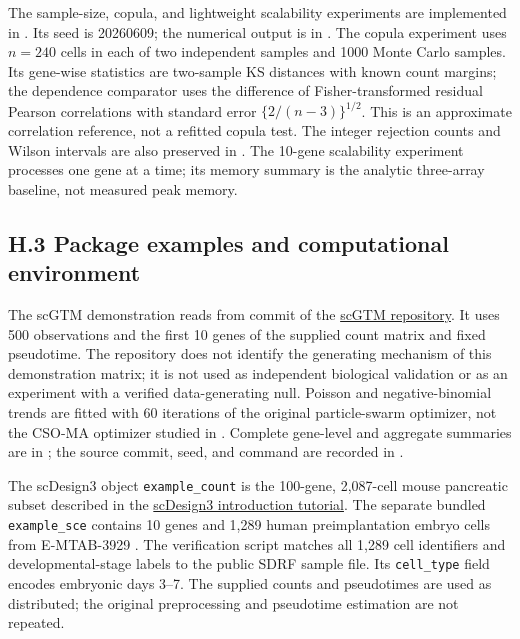\documentclass[12pt]{article}
\theoremstyle{remark}
\begin{document}
The sample-size, copula, and lightweight scalability
experiments are implemented in
. Its seed is 20260609;
the numerical output is in
. The copula experiment uses
$n=240$ cells in each of two independent samples and 1000 Monte Carlo samples.
Its gene-wise statistics are two-sample KS distances with known count margins;
the dependence comparator uses the difference of Fisher-transformed residual
Pearson correlations with standard error $\{2/(n-3)\}^{1/2}$. This is an
approximate correlation reference, not a refitted copula test.
The integer rejection counts and Wilson intervals are also preserved in
. The
10-gene scalability experiment processes one gene at a time; its memory
summary is the analytic three-array baseline, not measured peak memory.

\subsection*{H.3 Package examples and computational environment}

The scGTM demonstration reads
 from commit
 of the
\href{https://github.com/ElvisCuiHan/scGTM}{scGTM repository}.
It uses 500 observations and the first 10 genes of the supplied count matrix
and fixed pseudotime. The repository does not identify the generating
mechanism of this demonstration matrix; it is not used as independent
biological validation or as an experiment with a verified data-generating null.
Poisson and negative-binomial trends are fitted with 60
iterations of the original particle-swarm optimizer, not the CSO-MA optimizer
studied in \cite{cui2024natureinspired}. Complete gene-level and aggregate
summaries are in ; the source commit, seed, and
command are recorded in .

The scDesign3 object \texttt{example\_count} is the 100-gene, 2,087-cell
mouse pancreatic subset described in the
\href{https://songdongyuan1994.github.io/scDesign3/docs/articles/scDesign3-introduction-vignette.html}{scDesign3 introduction tutorial}.
The separate bundled \texttt{example\_sce} contains 10 genes and 1,289 human
preimplantation embryo cells from E-MTAB-3929 \cite{petropoulos2016embryos}.
The verification script  matches
all 1,289 cell identifiers and developmental-stage labels to the public SDRF
sample file. Its \texttt{cell\_type} field encodes embryonic days 3--7.
The supplied counts and pseudotimes are used as distributed; the original
preprocessing and pseudotime estimation are not repeated.
\end{document}

